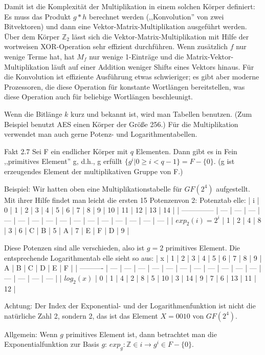 \documentclass[a4paper]{article}
\begin{document}
\begin{multicols}{3}
Damit ist die Komplexität der Multiplikation in einem solchen Körper definiert: Es muss das Produkt $g*h$ berechnet werden (,,Konvolution'' von zwei Bitvektoren) und dann eine Vektor-Matrix-Multiplikation ausgeführt werden. Über dem Körper $\mathbb{Z}_2$ lässt sich die Vektor-Matrix-Multiplikation mit Hilfe der wortweisen XOR-Operation sehr effizient durchführen. Wenn zusätzlich $f$ nur wenige Terme hat, hat $M_f$ nur wenige 1-Einträge und die Matrix-Vektor-Multiplikation läuft auf einer Addition weniger Shifts eines Vektors hinaus. Für die Konvolution ist effiziente Ausführung etwas schwieriger; es gibt aber moderne Prozessoren, die diese Operation für konstante Wortlängen bereitstellen, was diese Operation auch für beliebige Wortlängen beschleunigt.

Wenn die Bitlänge $k$ kurz und bekannt ist, wird man Tabellen benutzen. (Zum Beispiel benutzt AES einen Körper der Größe 256.) Für die Multiplikation verwendet man auch gerne Potenz- und Logarithmentabellen.

Fakt 2.7 Sei F ein endlicher Körper mit $q$ Elementen. Dann gibt es in Fein ,,primitives Element'' g, d.h., g erfüllt $\{g^i| 0 \geq i < q-1\}=F-\{0\}$. (g ist erzeugendes Element der multiplikativen Gruppe von F.)

Beispiel: Wir hatten oben eine Multiplikationstabelle für $GF(2^4)$ aufgestellt. Mit ihrer Hilfe findet man leicht die ersten 15 Potenzenvon 2:
Potenztab elle:
| i              | 0   | 1   | 2   | 3   | 4   | 5   | 6   | 7   | 8   | 9   | 10  | 11  | 12  | 13  | 14  |
| -------------- | --- | --- | --- | --- | --- | --- | --- | --- | --- | --- | --- | --- | --- | --- | --- |
| $exp_2(i)=2^i$ | 1   | 2   | 4   | 8   | 3   | 6   | C   | B   | 5   | A   | 7   | E   | F   | D   | 9   |

Diese Potenzen sind alle verschieden, also ist $g=2$ primitives Element. Die entsprechende Logarithmentab elle sieht so aus:
| x          | 1   | 2   | 3   | 4   | 5   | 6   | 7   | 8   | 9   | A   | B   | C   | D   | E   | F   |
| ---------- | --- | --- | --- | --- | --- | --- | --- | --- | --- | --- | --- | --- | --- | --- | --- |
| $log_2(x)$ | 0   | 1   | 4   | 2   | 8   | 5   | 10  | 3   | 14  | 9   | 7   | 6   | 13  | 11  | 12  |

Achtung: Der Index der Exponential- und der Logarithmenfunktion ist nicht die natürliche Zahl 2, sondern 2, das ist das Element $X=0010$ von $GF(2^4)$.

Allgemein: Wenn $g$ primitives Element ist, dann betrachtet man die Exponentialfunktion zur Basis $g$: $exp_g:\mathbb{Z}\in i\rightarrow g^i\in F-\{0\}$.


\end{multicols}
\end{document}
